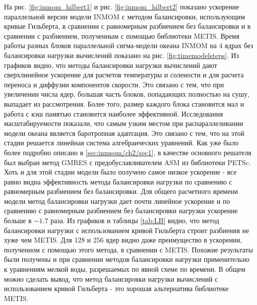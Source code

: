 	На рис. \ref{fig:inmom_hilbert1} и рис. \ref{fig:inmom_hilbert2} показано ускорение параллельной версии модели INMOM с методом балансировки, использующим кривые Гильберта, в сравнении с равномерным разбиением без балансировки и в сравнении с разбиением, полученным с помощью библиотеки METIS.      
Время работы разных блоков параллельной сигма-модели океана INMOM на 4 ядрах без балансировки нагрузки вычислений показано на рис. \ref{fig:timemodelsteps}.
Из графиков видно, что методы балансировки нагрузки вычислений дают 
    сверхлинейное ускорение для расчетов температуры и солености %
    и для
    расчета переноса и диффузии компонентов скорости. %
    Это связано с тем, что при увеличении числа ядер, 
    большая часть блоков, попадающих полностью на сушу, выпадает из рассмотрения. %
    Более того, размер каждого блока становится мал и работа с кэш памятью становится наиболее эффективной.
    Исследования масштабируемости показали, что самым узким местом при распараллеливании модели океана является баротропная адаптация. %
    Это связано с тем, что
    на этой стадии решается линейная система алгебраических уравнений.
    Как уже было более подробно описано в \ref{sec:inmsom/ch2/sec1}, в качестве основного
    решателя был выбран
    метод GMRES с предобуславливателем ASM из библиотеки PETSc.
    Хоть и для этой стадии модели было получено самое низкое ускорение - 
    все равно видна эффективность метода балансировки нагрузки по сравнению с равномерным
    разбиением без балансировки.
    Для общего расчетного времени модели метод балансировки нагрузки дает почти линейное ускорение и по сравнению с равномерным разбиением без балансировки нагрузки ускорение больше в $\sim 1.7$ раза.
	Из графиков и таблицы \ref{tab:LB} видно, что метод балансировки нагрузки с использованием кривой Гильберта строит разбиения не хуже чем METIS.
	Для 128 и 256 ядер видно даже преимущество в ускорении, полученном с помощью
	этого метода, в сравнении с METIS.
	Похожие результаты были получены и при сравнении методов балансировки нагрузки
	применительно к уравнениям мелкой воды, разрешаемых по явной схеме по времени. %
    В общем можно сделать вывод, что метод балансировки нагрузки вычислений с 
    использованием кривой Гильберта - это хорошая альтернатива библиотеке METIS.
    
